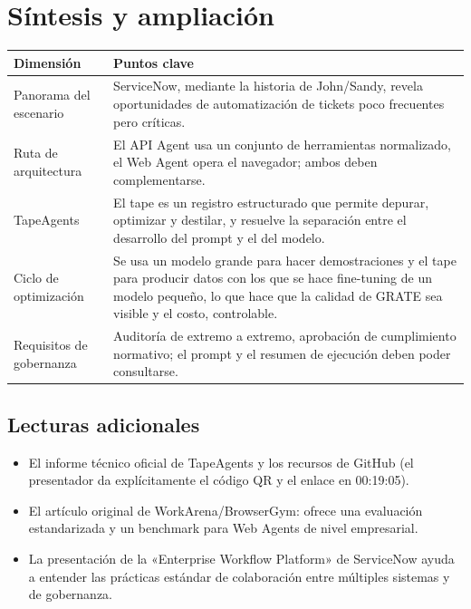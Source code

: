 \documentclass[a4paper]{article}
\begin{document}
\section{Síntesis y ampliación}
\begin{tabular}{@{}p{4.5cm}p{11cm}@{}}
\toprule
Dimensión & Puntos clave \\
\midrule
Panorama del escenario & ServiceNow, mediante la historia de John/Sandy, revela oportunidades de automatización de tickets poco frecuentes pero críticas. \\
Ruta de arquitectura & El API Agent usa un conjunto de herramientas normalizado, el Web Agent opera el navegador; ambos deben complementarse. \\
TapeAgents & El tape es un registro estructurado que permite depurar, optimizar y destilar, y resuelve la separación entre el desarrollo del prompt y el del modelo. \\
Ciclo de optimización & Se usa un modelo grande para hacer demostraciones y el tape para producir datos con los que se hace fine-tuning de un modelo pequeño, lo que hace que la calidad de GRATE sea visible y el costo, controlable. \\
Requisitos de gobernanza & Auditoría de extremo a extremo, aprobación de cumplimiento normativo; el prompt y el resumen de ejecución deben poder consultarse. \\
\bottomrule
\end{tabular}

\subsection{Lecturas adicionales}
\begin{itemize}
    \item El informe técnico oficial de TapeAgents y los recursos de GitHub (el presentador da explícitamente el código QR y el enlace en 00:19:05).\newline
    \item El artículo original de WorkArena/BrowserGym: ofrece una evaluación estandarizada y un benchmark para Web Agents de nivel empresarial.
    \item La presentación de la «Enterprise Workflow Platform» de ServiceNow ayuda a entender las prácticas estándar de colaboración entre múltiples sistemas y de gobernanza.
\end{itemize}
\end{document}
